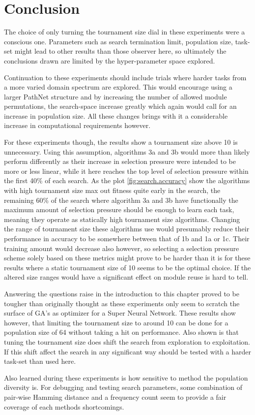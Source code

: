 \section{Conclusion}

The choice of only turning the tournament size dial in these experiments were a conscious one. Parameters such as search termination limit, population size, task-set might lead to other results than those observer here, so ultimately the conclusions drawn are limited by the hyper-parameter space explored. 

Continuation to these experiments should include trials where harder tasks from a more varied domain spectrum are explored. This would encourage using a larger PathNet structure and by increasing the number of allowed module permutations, the search-space increase greatly which again would call for an increase in population size. All these changes brings with it a considerable increase in computational requirements however. 

For these experiments though, the results show a tournament size above 10 is unnecessary. Using this assumption, algorithms 3a and 3b would more than likely perform differently as their increase in selection pressure were intended to be more or less linear, while it here reaches the top level of selection pressure within the first 40\% of each search. As the plot \ref{fig:search.accuracy} show the algorithms with high tournament size max out fitness quite early in the search, the remaining 60\% of the search where algorithm 3a and 3b have functionally the maximum amount of selection pressure should be enough to learn each task, meaning they operate as statically high tournament size algorithms. Changing the range of tournament size these algorithms use would presumably reduce their performance in accuracy to be somewhere between that of 1b and 1a or 1c. Their training amount would decrease also however, so selecting a selection pressure scheme solely based on these metrics might prove to be harder than it is for these results where a static tournament size of 10 seems to be the optimal choice. If the altered size ranges would have a significant effect on module reuse is hard to tell. 

Answering the questions raise in the introduction to this chapter proved to be tougher than originally thought as these experiments only seem to scratch the surface of GA's as optimizer for a Super Neural Network. These results show however, that limiting the tournament size to around 10 can be done for a population size of 64 without taking a hit on performance. Also shown is that tuning the tournament size does shift the search from exploration to exploitation. If this shift affect the search in any significant way should be tested with a harder task-set than used here. 

Also learned during these experiments is how sensitive to method the population diversity is. For debugging and testing search parameters, some combination of pair-wise Hamming distance and a frequency count seem to provide a fair coverage of each methods shortcomings.  

